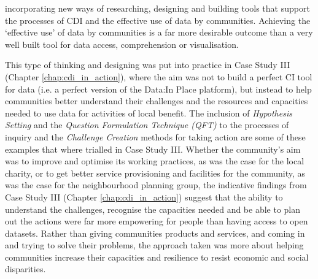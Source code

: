 incorporating new ways of researching, designing and building tools that support the processes of CDI and the effective use of data by communities. Achieving the `effective use' of data by communities \citep{gurstein_effective_2003} is a far more desirable outcome than a very well built tool for data access, comprehension or visualisation.

This type of thinking and designing was put into practice in Case Study III (Chapter \ref{chap:cdi_in_action}), where the aim was not to build a perfect CI tool for data (i.e. a perfect version of the Data:In Place platform), but instead to help communities better understand their challenges and the resources and capacities needed to use data for activities of local benefit. The inclusion of \textit{Hypothesis Setting} and the \textit{Question Formulation Technique (QFT)} to the processes of inquiry and the \textit{Challenge Creation} methods for taking action are some of these examples that where trialled in Case Study III. Whether the community's aim was to improve and optimise its working practices, as was the case for the local charity, or to get better service provisioning and facilities for the community, as was the case for the neighbourhood planning group, the indicative findings from Case Study III (Chapter \ref{chap:cdi_in_action}) suggest that the ability to understand the challenges, recognise the capacities needed and be able to plan out the actions were far more empowering for people than having access to open datasets. Rather than giving communities products and services, and coming in and trying to solve their problems, the approach taken was more about helping communities increase their capacities and resilience to resist economic and social disparities. 

